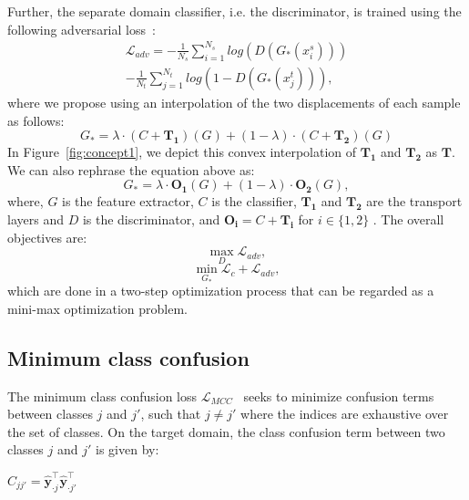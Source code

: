 \documentclass[10pt,twocolumn,letterpaper]{article}
\begin{document}
Further, the separate domain classifier, i.e. the discriminator, is trained using the following adversarial loss~\cite{cdan,dann}:
\begin{equation} 
    \begin{aligned}
    \mathcal{L}_{adv} =  -\frac{1}{N_s} \sum_{i=1}^{N_s}log(D(G_*(x_i^s)))\\ -\frac{1}{N_t} \sum_{j=1}^{N_t}log(1-D(G_*(x_j^t))),
    \end{aligned}
\end{equation}
where we propose using an interpolation of the two displacements of each sample as follows: 
\begin{equation}
    G_* = \lambda \cdot (C+\mathbf{T_1})(G) + (1 - \lambda) \cdot (C+\mathbf{T_2})(G)
\end{equation}
In Figure~\ref{fig:concept1}, we depict this convex interpolation of $\mathbf{T_1}$ and $\mathbf{T_2}$ as $\mathbf{T}$. We can also rephrase the equation above as:
\begin{equation}
    G_* = \lambda \cdot \mathbf{O_1}(G) + (1 - \lambda) \cdot \mathbf{O_2}(G),
\end{equation}
where, $G$ is the feature extractor, $C$ is the classifier, $\mathbf{T_1}$ and $\mathbf{T_2}$ are the transport layers and $D$ is the discriminator, and $\mathbf{O_i} = C+\mathbf{T_i} $ for $ i \in \{1,2\}$ . The overall objectives are:
\begin{equation} \max\limits_{D} \mathcal{L}_{adv},
\end{equation} 
\begin{equation} 
    \min\limits_{G_*} \mathcal{L}_{c} +\mathcal{L}_{adv},
\end{equation} 
which are done in a two-step optimization process that can be regarded as a mini-max optimization problem.


\subsection{Minimum class confusion}

The minimum class confusion loss $\mathcal{L}_{MCC}$~\cite{mcc} seeks to minimize confusion terms between classes $j$ and $j'$, such that $j \neq j'$ where the indices are exhaustive over the set of classes. On the target domain, the class confusion term between two classes $j$ and $j'$ is given by:  \begin{center}
     $C_{jj'} =  \hat{\mathbf{y}}_{\cdot j}^{\intercal} \hat{\mathbf{y}}_{\cdot j'}^{\intercal}$ 
 \end{center} 
 
\end{document}
